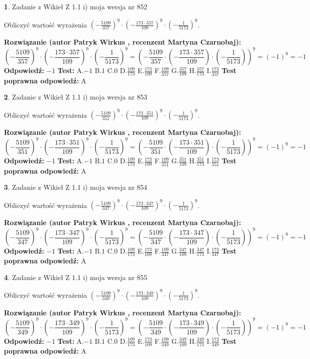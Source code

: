 \documentclass[12pt, a4paper]{article}
\theoremstyle{definition} %
\newtheorem{zad}{}
\newcommand{\zadStart}[1]{\begin{zad}#1\newline}
\newcommand{\zadStop}{\end{zad}}
\newcommand{\rozwStart}[2]{\noindent \textbf{Rozwiązanie (autor #1 , recenzent #2): }\newline}
\newcommand{\rozwStop}{\newline}
\newcommand{\odpStart}{\noindent \textbf{Odpowiedź:}\newline}
\newcommand{\odpStop}{\newline}
\newcommand{\testStart}{\noindent \textbf{Test:}\newline}
\newcommand{\testStop}{\newline}
\newcommand{\kluczStart}{\noindent \textbf{Test poprawna odpowiedź:}\newline}
\newcommand{\kluczStop}{\newline}
\begin{document}
\zadStart{Zadanie z Wikieł Z 1.1 i) moja wersja nr 852}

Obliczyć wartość wyrażenia $(-\frac{5109}{357})^{9} \cdot (-\frac{173 \cdot 357}{109})^{9} \cdot (-\frac{1}{5173})^{9}$.
\zadStop
\rozwStart{Patryk Wirkus}{Martyna Czarnobaj}
$$(-\frac{5109}{357})^{9} \cdot (-\frac{173 \cdot 357}{109})^{9} \cdot (-\frac{1}{5173})^{9} = (-\frac{5109}{357} \cdot (-\frac{173 \cdot 357}{109}) \cdot (-\frac{1}{5173}))^{9} = (-1)^{9} = -1$$
\rozwStop
\odpStart
$-1$
\odpStop
\testStart
A.$-1$ B.$1$ C.$0$ D.$\frac{109}{173}$ E.$\frac{173}{109}$
F.$\frac{109}{357}$ G.$\frac{357}{109}$
H.$\frac{357}{173}$
I.$\frac{173}{357}$
\testStop
\kluczStart
A
\kluczStop



\zadStart{Zadanie z Wikieł Z 1.1 i) moja wersja nr 853}

Obliczyć wartość wyrażenia $(-\frac{5109}{351})^{9} \cdot (-\frac{173 \cdot 351}{109})^{9} \cdot (-\frac{1}{5173})^{9}$.
\zadStop
\rozwStart{Patryk Wirkus}{Martyna Czarnobaj}
$$(-\frac{5109}{351})^{9} \cdot (-\frac{173 \cdot 351}{109})^{9} \cdot (-\frac{1}{5173})^{9} = (-\frac{5109}{351} \cdot (-\frac{173 \cdot 351}{109}) \cdot (-\frac{1}{5173}))^{9} = (-1)^{9} = -1$$
\rozwStop
\odpStart
$-1$
\odpStop
\testStart
A.$-1$ B.$1$ C.$0$ D.$\frac{109}{173}$ E.$\frac{173}{109}$
F.$\frac{109}{351}$ G.$\frac{351}{109}$
H.$\frac{351}{173}$
I.$\frac{173}{351}$
\testStop
\kluczStart
A
\kluczStop



\zadStart{Zadanie z Wikieł Z 1.1 i) moja wersja nr 854}

Obliczyć wartość wyrażenia $(-\frac{5109}{347})^{9} \cdot (-\frac{173 \cdot 347}{109})^{9} \cdot (-\frac{1}{5173})^{9}$.
\zadStop
\rozwStart{Patryk Wirkus}{Martyna Czarnobaj}
$$(-\frac{5109}{347})^{9} \cdot (-\frac{173 \cdot 347}{109})^{9} \cdot (-\frac{1}{5173})^{9} = (-\frac{5109}{347} \cdot (-\frac{173 \cdot 347}{109}) \cdot (-\frac{1}{5173}))^{9} = (-1)^{9} = -1$$
\rozwStop
\odpStart
$-1$
\odpStop
\testStart
A.$-1$ B.$1$ C.$0$ D.$\frac{109}{173}$ E.$\frac{173}{109}$
F.$\frac{109}{347}$ G.$\frac{347}{109}$
H.$\frac{347}{173}$
I.$\frac{173}{347}$
\testStop
\kluczStart
A
\kluczStop



\zadStart{Zadanie z Wikieł Z 1.1 i) moja wersja nr 855}

Obliczyć wartość wyrażenia $(-\frac{5109}{349})^{9} \cdot (-\frac{173 \cdot 349}{109})^{9} \cdot (-\frac{1}{5173})^{9}$.
\zadStop
\rozwStart{Patryk Wirkus}{Martyna Czarnobaj}
$$(-\frac{5109}{349})^{9} \cdot (-\frac{173 \cdot 349}{109})^{9} \cdot (-\frac{1}{5173})^{9} = (-\frac{5109}{349} \cdot (-\frac{173 \cdot 349}{109}) \cdot (-\frac{1}{5173}))^{9} = (-1)^{9} = -1$$
\rozwStop
\odpStart
$-1$
\odpStop
\testStart
A.$-1$ B.$1$ C.$0$ D.$\frac{109}{173}$ E.$\frac{173}{109}$
F.$\frac{109}{349}$ G.$\frac{349}{109}$
H.$\frac{349}{173}$
I.$\frac{173}{349}$
\testStop
\kluczStart
A
\kluczStop
\end{document}
